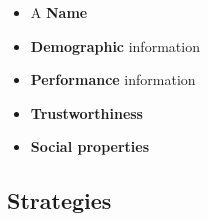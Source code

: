 \begin{itemize}
    \item A \textbf{Name}
    \item \textbf{Demographic} information
    \item \textbf{Performance} information
    \item \textbf{Trustworthiness}
    \item \textbf{Social properties}
\end{itemize}




























\subsection{Strategies}



